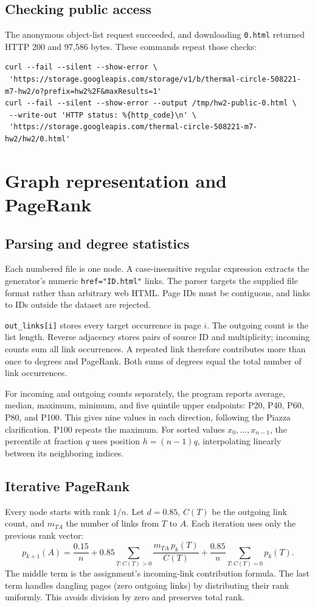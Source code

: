 \documentclass[10pt,letterpaper]{article}
\begin{document}
\subsection{Checking public access}
The anonymous object-list request succeeded, and downloading \texttt{0.html}
returned HTTP 200 and 97,586 bytes. These commands repeat those checks:
\begin{lstlisting}
curl --fail --silent --show-error \
 'https://storage.googleapis.com/storage/v1/b/thermal-circle-508221-m7-hw2/o?prefix=hw2%2F&maxResults=1'
curl --fail --silent --show-error --output /tmp/hw2-public-0.html \
 --write-out 'HTTP status: %{http_code}\n' \
 'https://storage.googleapis.com/thermal-circle-508221-m7-hw2/hw2/0.html'
\end{lstlisting}

\clearpage
\section{Graph representation and PageRank}
\subsection{Parsing and degree statistics}
Each numbered file is one node. A case-insensitive regular expression extracts
the generator's numeric \texttt{href="ID.html"} links. The parser targets the
supplied file format rather than arbitrary web HTML. Page IDs must be contiguous,
and links to IDs outside the dataset are rejected.

\texttt{out\_links[i]} stores every target occurrence in page \(i\).
The outgoing count is the list length. Reverse adjacency stores pairs of source
ID and multiplicity; incoming counts sum all link occurrences. A repeated link
therefore contributes more than once to degrees and PageRank. Both sums of
degrees equal the total number of link occurrences.

For incoming and outgoing counts separately, the program reports average,
median, maximum, minimum, and five quintile upper endpoints: P20, P40, P60,
P80, and P100. This gives nine values in each direction, following the Piazza
clarification. P100 repeats the maximum. For sorted values \(x_0,\ldots,x_{n-1}\),
the percentile at fraction \(q\) uses position \(h=(n-1)q\), interpolating
linearly between its neighboring indices.

\subsection{Iterative PageRank}
Every node starts with rank \(1/n\). Let \(d=0.85\), \(C(T)\) be the outgoing
link count, and \(m_{TA}\) the number of links from \(T\) to \(A\). Each iteration
uses only the previous rank vector:
\[
p_{k+1}(A)=\frac{0.15}{n}
 +0.85\sum_{T:C(T)>0}\frac{m_{TA}\,p_k(T)}{C(T)}
 +\frac{0.85}{n}\sum_{T:C(T)=0}p_k(T).
\]
The middle term is the assignment's incoming-link contribution formula. The
last term handles dangling pages (zero outgoing links) by distributing their
rank uniformly. This avoids division by zero and preserves total rank.
\end{document}
